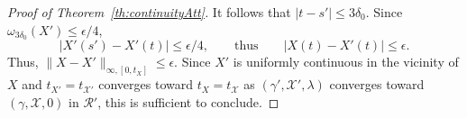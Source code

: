 \documentclass[11pt]{article}
\begin{document}
\begin{proof}[Proof of Theorem~\ref{th:continuityAtt}]
It follows that $|t-s'|\leq 3\delta_0$. Since $\omega_{3\delta_0}(X')\leq \epsilon/4$,
\[ |X'(s')-X'(t)|\leq  \epsilon/4,\qquad \mbox{thus}  \qquad   |X(t)-X'(t)|\leq  \epsilon.\]
Thus,
$\|X-X'\|_{\infty,[0,t_X]}\leq \epsilon$. Since $X'$ is uniformly continuous in the vicinity of $X$ and $t_{X'}=t_{\mathcal{X}'}$ converges toward $t_X=t_{\mathcal{X}}$ as $(\gamma',\mathcal{X}',\lambda)$ converges toward $(\gamma,\mathcal{X},0)$ in $\mathcal{R}'$, this is sufficient to conclude.
%
%
%
%
%
%
%
%
%
%
%
%
%
%
%
%
%

\end{proof}
\end{document}
